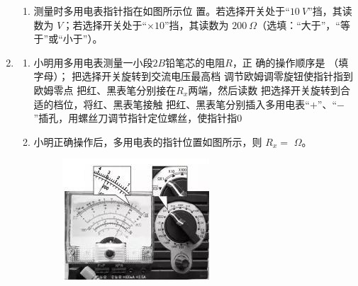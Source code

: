 \begin{enumerate}
\begin{enumerate}
\item 
测量时多用电表指针指在如图所示位
置。若选择开关处于“$ 10 \ V $”挡，其读数为 \underlinegap $ V $；若选择开关处于“$ \times 10 $”挡，其读数为 \underlinegap 
$ 200 \ \Omega $（选填：“大于”，“等于”或“小于”）。
\begin{figure}[h!]
\centering

\end{figure}

\end{enumerate}



\item 
{}
\begin{enumerate}
\item
小明用多用电表测量一小段$ 2B $铅笔芯的电阻$ R $，正
确的操作顺序是 \underlinegap （填字母）；
\fivechoices
{把选择开关旋转到交流电压最高档}
{调节欧姆调零旋钮使指针指到欧姆零点}
{把红、黑表笔分别接在$ R_{x} $两端，然后读数}
{把选择开关旋转到合适的档位，将红、黑表笔接触}
{把红、黑表笔分别插入多用电表“$ + $”、“$ - $”插孔，用螺丝刀调节指针定位螺丝，使指针指$ 0 $}

\item 
小明正确操作后，多用电表的指针位置如图所示，则
$ R_{x} =$ \underlinegap $ \Omega $。
\begin{figure}[h!]
\centering
\includegraphics[width=0.47\linewidth]{picture/screenshot061}
\end{figure}


\end{enumerate}
\end{enumerate}
